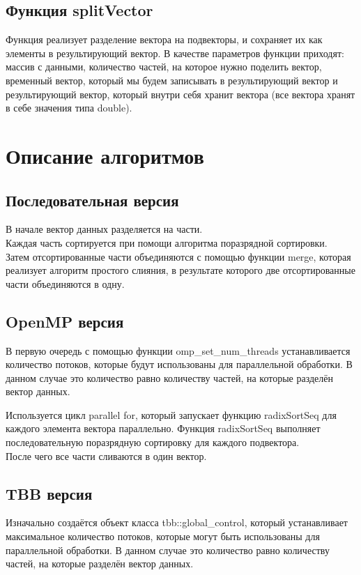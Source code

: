 \documentclass{article}
\begin{document}
\subsection{Функция splitVector} 
Функция реализует разделение вектора на подвекторы, и сохраняет их как элементы в результирующий вектор. В качестве параметров функции приходят: массив с данными, количество частей, на которое нужно поделить вектор, временный вектор, который мы будем записывать в результирующий вектор и результирующий вектор, который внутри себя хранит вектора (все вектора хранят в себе значения типа double).

\newpage
\section{Описание алгоритмов}

\subsection{Последовательная версия}

В начале вектор данных разделяется на части.\\Каждая часть сортируется при помощи алгоритма поразрядной сортировки.\\Затем отсортированные части объединяются с помощью функции merge, которая реализует алгоритм простого слияния, в результате которого две отсортированные части объединяются в одну.

\subsection{OpenMP версия}

В первую очередь с помощью функции omp\_set\_num\_threads устанавливается количество потоков, которые будут использованы для параллельной обработки. В данном случае это количество равно количеству частей, на которые разделён вектор данных.

Используется цикл parallel for, который запускает функцию radixSortSeq для каждого элемента вектора параллельно. Функция radixSortSeq выполняет последовательную поразрядную сортировку для каждого подвектора.\\
После чего все части сливаются в один вектор.

\subsection{TBB версия}
Изначально создаётся объект класса tbb::global\_control, который устанавливает максимальное количество потоков, которые могут быть использованы для параллельной обработки. В данном случае это количество равно количеству частей, на которые разделён вектор данных.
\end{document}
